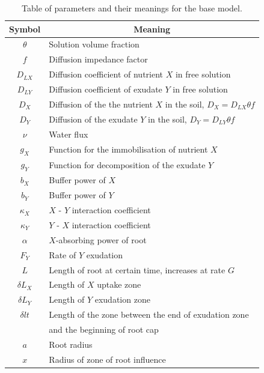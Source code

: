 \documentclass[11pt]{article}
\numberwithin{equation}{section}
\begin{document}
\begin{table}[!htb]
\begin{center}
\fontsize{9.5}{7}\selectfont
\setlength{\tabcolsep}{5.pt}
\def\arraystretch{1.5}
\begin{tabular}{cl}
\toprule
    \bf Symbol & \multicolumn{1}{c}{\bf Meaning}
    \\ \midrule
    $\theta$ & Solution volume fraction \\
    $f$ & Diffusion impedance factor \\
    $D_{LX}$ & Diffusion coefficient of nutrient $X$  in free solution \\
    $D_{LY}$ & Diffusion coefficient of exudate $Y$  in free solution \\
    $D_X$ & Diffusion of the the nutrient $X$ in the soil, $D_X = D_{LX} \theta f$  \\  
	$D_{Y}$ &  Diffusion of the exudate $Y$ in the soil, $D_{Y} = D_{LY} \theta f$  \\ 
	$\nu$ & Water flux\\
	$g_X$ & Function for the immobilisation of nutrient $X$ \\
	$g_{Y}$ & Function for decomposition of the exudate $Y$ \\
	$b_X$ & Buffer power of $X$ \\
	$b_{Y}$ & Buffer power of $Y$ \\
	$\kappa_{X}$ & $X$ - $Y$ interaction coefficient \\
	$\kappa_{Y}$ & $Y$ - $X$ interaction coefficient\\
	$\alpha $ & $X$-absorbing power of root \\
	$F_{Y} $ & Rate of $Y$ exudation  \\
	$L$ & Length of root at certain time, increases at rate $G$ \\
	$\delta L_{X}$ & Length of $X$ uptake zone \\
	$\delta L_{Y}$ & Length of $Y$ exudation zone  \\	
	$\delta lt$ & Length of the zone between the end of exudation zone\\& and the beginning of root cap \\
	$a$ & Root radius \\
	$x$ & Radius of zone of root influence \\
\bottomrule
\end{tabular}
\caption{Table of parameters and their meanings for the base model.
\label{t:First-model-params}}
\end{center}
\end{table}
\end{document}
